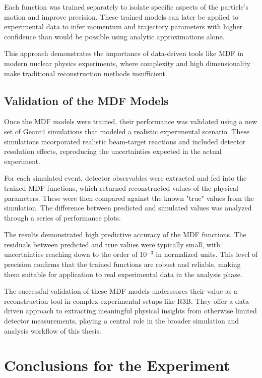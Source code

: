 Each function was trained separately to isolate specific aspects of the particle’s motion and improve precision. These trained models can later be applied to experimental data to infer momentum and trajectory parameters with higher confidence than would be possible using analytic approximations alone.

This approach demonstrates the importance of data-driven tools like MDF in modern nuclear physics experiments, where complexity and high dimensionality make traditional reconstruction methods insufficient.

\subsection{Validation of the MDF Models}

Once the MDF models were trained, their performance was validated using a new set of Geant4 simulations that modeled a realistic experimental scenario. These simulations incorporated realistic beam-target reactions and included detector resolution effects, reproducing the uncertainties expected in the actual experiment.

For each simulated event, detector observables were extracted and fed into the trained MDF functions, which returned reconstructed values of the physical parameters. These were then compared against the known "true" values from the simulation. The difference between predicted and simulated values was analyzed through a series of performance plots.

The results demonstrated high predictive accuracy of the MDF functions. The residuals between predicted and true values were typically small, with uncertainties reaching down to the order of 10$^{-3}$ in normalized units. This level of precision confirms that the trained functions are robust and reliable, making them suitable for application to real experimental data in the analysis phase.

The successful validation of these MDF models underscores their value as a reconstruction tool in complex experimental setups like \gls{R3B}. They offer a data-driven approach to extracting meaningful physical insights from otherwise limited detector measurements, playing a central role in the broader simulation and analysis workflow of this thesis.


\section{Conclusions for the Experiment}